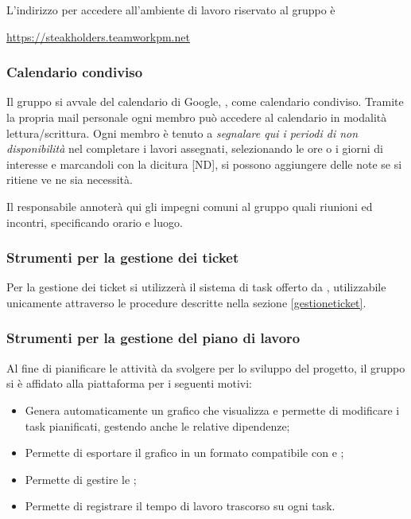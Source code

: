 	L'indirizzo per accedere all'ambiente di lavoro riservato al gruppo è
	\begin{center}
		\url{https://steakholders.teamworkpm.net}
	\end{center}
	
	\subsubsection{Calendario condiviso}
	\label{Calendario condiviso}
			
	Il gruppo si avvale del calendario di Google, , come calendario condiviso.
	Tramite la propria mail personale ogni membro può accedere al calendario in modalità lettura/scrittura.
	Ogni membro è tenuto a \emph{segnalare qui i periodi di non disponibilità} nel completare i lavori assegnati, selezionando le ore o i giorni di interesse e marcandoli con la dicitura [ND], si possono aggiungere delle note se si ritiene ve ne sia necessità. 
	
	Il responsabile annoterà qui gli impegni comuni al gruppo quali riunioni ed incontri, specificando orario e luogo.
	
	\subsubsection{Strumenti per la gestione dei ticket}
	\label{teamwork}
	Per la gestione dei ticket si utilizzerà il sistema di task offerto da , utilizzabile unicamente attraverso le procedure descritte nella sezione \ref{gestioneticket}.
	
	\subsubsection{Strumenti per la gestione del piano di lavoro}
	
	Al fine di pianificare le attività da svolgere per lo sviluppo del progetto, il gruppo si è affidato alla piattaforma  per i seguenti motivi:
	\begin{itemize}
		\item Genera automaticamente un grafico  che visualizza e permette di modificare i task pianificati, gestendo anche le relative dipendenze;
		\item Permette di esportare il grafico  in un formato compatibile con  e ;
		\item Permette di gestire le ;
		\item Permette di registrare il tempo di lavoro trascorso su ogni task.
	\end{itemize}

